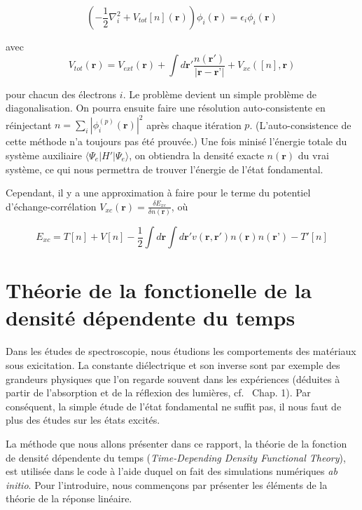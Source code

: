 \documentclass[12pt, french]{report}
\theoremstyle{theoreme}
\begin{document}
$$
(-\frac{1}{2}\nabla_i^2 + V_{tot}[n](\textbf{r}))\phi_i(\textbf{r}) = \epsilon_i \phi_i (\textbf{r})
$$

avec
\begin{equation}\label{Vtot}
V_{tot}(\textbf{r}) = V_{ext}(\textbf{r}) + \int d\textbf{r}' \frac{n(\textbf{r}')}{|\textbf{r} - \textbf{r'}|} + V_{xc}([n], \textbf{r})
\end{equation}

pour chacun des électrons $i$. Le problème devient un simple problème de diagonalisation. On pourra ensuite faire une résolution auto-consistente en réinjectant $n = \sum_i |\phi_i^{(p)}(\textbf{r})|^2 $ après chaque itération $p$. (L'auto-consistence de cette méthode n'a toujours pas été prouvée.) Une fois minisé l'énergie totale du système auxiliaire $\langle \Psi_e | H' | \Psi_e \rangle $, on obtiendra la densité exacte $n(\textbf{r})$ du vrai système, ce qui nous permettra de trouver l'énergie de l'état fondamental.

Cependant, il y a une approximation à faire pour le terme du potentiel d'échange-corrélation $V_{xc}(\textbf{r}) = \frac{\delta E_{xc}}{\delta n(\textbf{r})}$, où

\begin{equation}
\label{eqn-exc}
  E_{xc} = T[n] + V[n] - \frac{1}{2}\int d\textbf{r}
  \int d\textbf{r}' v(\textbf{r}, \textbf{r}') n(\textbf{r}) n(\textbf{r'}) - T'[n]
\end{equation}


\section{Théorie de la fonctionelle de la densité dépendente du temps}\label{TDDFT}
Dans les études de spectroscopie, nous étudions les comportements des matériaux sous exicitation. La constante diélectrique et son inverse sont par exemple des grandeurs physiques que l'on regarde souvent dans les expériences (déduites à partir de l'absorption et de la réflexion des lumières, cf.~\cite{Sot03} Chap. 1). Par conséquent, la simple étude de l'état fondamental ne suffit pas, il nous faut de plus des études sur les états excités.

La méthode que nous allons présenter dans ce rapport, la théorie de la fonction de densité dépendente du temps (\textit{Time-Depending Density Functional Theory}), est utilisée dans le code à l'aide duquel on fait des simulations numériques \textit{ab initio}. Pour l'introduire, nous commençons par présenter les éléments de la théorie de la réponse linéaire.
\end{document}
